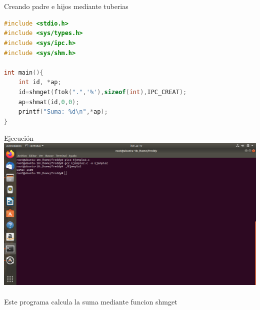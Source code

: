 \documentclass[11pt,a4paper]{report}
\begin{document}
\\
\\
Creando padre e hijos mediante tuberias
\clearpage
\begin{lstlisting}[language=C++, caption={Ejemplo2}]
#include <stdio.h>
#include <sys/types.h>
#include <sys/ipc.h>
#include <sys/shm.h>

int main(){
	int id, *ap;
	id=shmget(ftok(".",'%'),sizeof(int),IPC_CREAT);
	ap=shmat(id,0,0);
	printf("Suma: %d\n",*ap);
}
\end{lstlisting}
Ejecuci\'on\\
\includegraphics[scale=.35]{ejemplo2.png}
\\
\\
Este programa calcula la suma mediante funcion shmget
\clearpage
\end{document}

